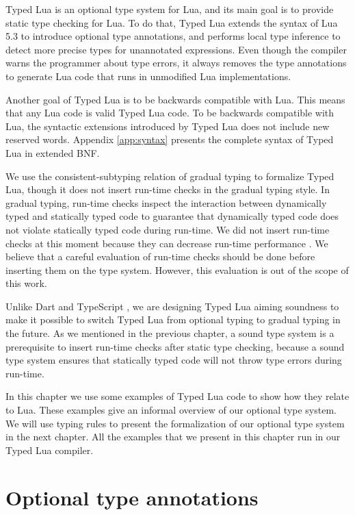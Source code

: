 Typed Lua is an optional type system for Lua, and its main goal is to
provide static type checking for Lua.
To do that, Typed Lua extends the syntax of Lua 5.3 to introduce
optional type annotations, and performs local type inference \citep{pierce2000lti}
to detect more precise types for unannotated expressions.
Even though the compiler warns the programmer about type errors,
it always removes the type annotations to generate Lua code that
runs in unmodified Lua implementations.

Another goal of Typed Lua is to be backwards compatible with Lua.
This means that any Lua code is valid Typed Lua code.
To be backwards compatible with Lua, the syntactic extensions introduced
by Typed Lua does not include new reserved words.
Appendix \ref{app:syntax} presents the complete syntax of Typed Lua
in extended BNF.

We use the consistent-subtyping relation of gradual typing
\citep{siek2007objects,siek2013mutable} to formalize Typed Lua,
though it does not insert run-time checks in the gradual typing style.
In gradual typing, run-time checks inspect the interaction between
dynamically typed and statically typed code to guarantee that dynamically
typed code does not violate statically typed code during run-time.
We did not insert run-time checks at this moment because they can decrease
run-time performance \citep{allende2013cis}.
We believe that a careful evaluation of run-time checks should be done before
inserting them on the type system.
However, this evaluation is out of the scope of this work.

Unlike Dart \citep{dart} and TypeScript \citep{typescript},
we are designing Typed Lua aiming soundness to make it possible to
switch Typed Lua from optional typing to gradual typing in the future.
As we mentioned in the previous chapter,
a sound type system is a prerequisite to insert run-time checks after
static type checking, because a sound type system ensures that
statically typed code will not throw type errors during run-time.

In this chapter we use some examples of Typed Lua code to show how
they relate to Lua.
These examples give an informal overview of our optional type system.
We will use typing rules to present the formalization of our optional type
system in the next chapter.
All the examples that we present in this chapter run in our Typed Lua compiler.

\section{Optional type annotations}
\label{sec:annotations}

